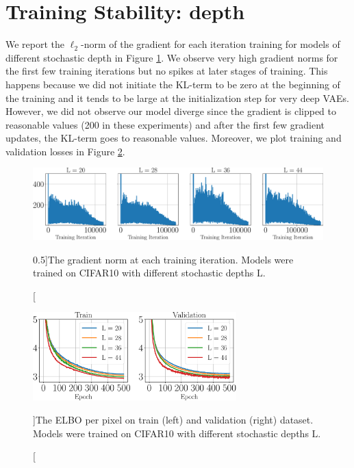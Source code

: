 \newpage
\section{Training Stability: depth}\label{appx:depth_experiment}

We report the $\ell_2$-norm of the gradient for each iteration training for models of different stochastic depth in Figure \ref{fig:grad_norm_depth}. We observe very high gradient norms for the first few training iterations but no spikes at later stages of training. 
This happens because we did not initiate the KL-term to be zero at the beginning of the training and it tends to be large at the initialization step for very deep VAEs. 
However, we did not observe our model diverge since the gradient is clipped to reasonable values (200 in these experiments) and after the first few gradient updates, the KL-term goes to reasonable values.
Moreover, we plot training and validation losses in Figure \ref{fig:losses_depth}.

\begin{figure}[t] 
\includegraphics[width=\textwidth]{pics/5_dvp/cifar_depth_grad_norm.pdf}
\caption[][0.5\baselineskip]{The gradient norm at each training iteration. Models were trained on CIFAR10 with different stochastic depths $\mathrm{L}$.}
\label{fig:grad_norm_depth}
\end{figure}

\begin{figure}[t] 
\centering
\includegraphics[width=0.7\textwidth]{pics/5_dvp/cifar_depth_losses.pdf}
\caption[][\baselineskip]{The ELBO per pixel on train (left) and validation (right) dataset. Models were trained on CIFAR10 with different stochastic depths $\mathrm{L}$.}
\label{fig:losses_depth}
\end{figure}

